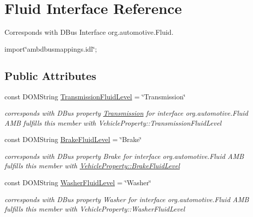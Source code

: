 \hypertarget{interfaceFluid}{\section{Fluid Interface Reference}
\label{interfaceFluid}
}


Corresponds with D\+Bus Interface org.\+automotive.\+Fluid.  




{\ttfamily import\char`\"{}ambdbusmappings.\+idl\char`\"{};}

\subsection*{Public Attributes}
\begin{DoxyCompactItemize}
\item 
\hypertarget{interfaceFluid_a6dfdefaa8d5ea2b2d13e99f4f9b8c642}{const D\+O\+M\+String \hyperlink{interfaceFluid_a6dfdefaa8d5ea2b2d13e99f4f9b8c642}{Transmission\+Fluid\+Level} = \char`\"{}Transmission\char`\"{}}\label{interfaceFluid_a6dfdefaa8d5ea2b2d13e99f4f9b8c642}

\begin{DoxyCompactList}\small\item\em corresponds with D\+Bus property \hyperlink{interfaceTransmission}{Transmission} for interface org.\+automotive.\+Fluid A\+M\+B fulfills this member with Vehicle\+Property\+::\+Transmission\+Fluid\+Level \end{DoxyCompactList}\item 
\hypertarget{interfaceFluid_a7514f249a3ca04b7d912b34499a7c7b2}{const D\+O\+M\+String \hyperlink{interfaceFluid_a7514f249a3ca04b7d912b34499a7c7b2}{Brake\+Fluid\+Level} = \char`\"{}Brake\char`\"{}}\label{interfaceFluid_a7514f249a3ca04b7d912b34499a7c7b2}

\begin{DoxyCompactList}\small\item\em corresponds with D\+Bus property Brake for interface org.\+automotive.\+Fluid A\+M\+B fulfills this member with \hyperlink{classVehicleProperty_a83bc635222e9ba14dfa134defa21e825}{Vehicle\+Property\+::\+Brake\+Fluid\+Level} \end{DoxyCompactList}\item 
\hypertarget{interfaceFluid_aae5235a67d088bd771525f3cef6136ee}{const D\+O\+M\+String \hyperlink{interfaceFluid_aae5235a67d088bd771525f3cef6136ee}{Washer\+Fluid\+Level} = \char`\"{}Washer\char`\"{}}\label{interfaceFluid_aae5235a67d088bd771525f3cef6136ee}

\begin{DoxyCompactList}\small\item\em corresponds with D\+Bus property Washer for interface org.\+automotive.\+Fluid A\+M\+B fulfills this member with Vehicle\+Property\+::\+Washer\+Fluid\+Level \end{DoxyCompactList}\end{DoxyCompactItemize}


